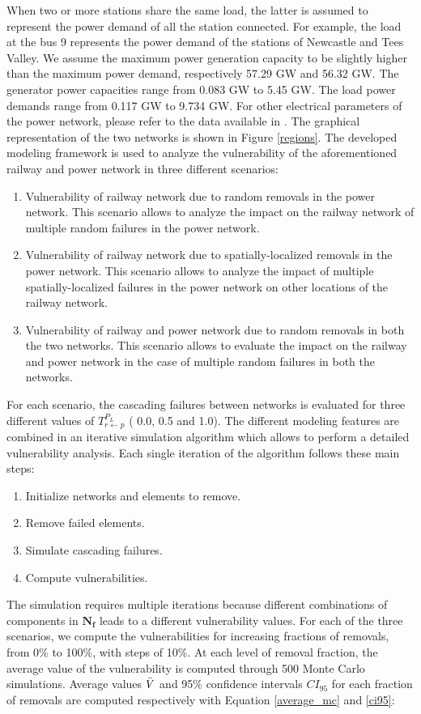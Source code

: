 \documentclass[review]{elsarticle}
\begin{document}
	When two or more stations share the same load, the latter is assumed to represent the power demand of all the station connected. For example, the load at the bus 9 represents the power demand of the stations of Newcastle and Tees Valley. We assume the maximum power generation capacity to be slightly higher than the maximum power demand, respectively 57.29 GW and 56.32 GW. The generator power capacities range from 0.083 GW to 5.45 GW. The load power demands range from 0.117 GW to 9.734 GW. For other electrical parameters of the power network, please refer to the data available in \cite{bukhsh2013network}. The graphical representation of the two networks is shown in Figure \ref{regions}.
The developed modeling framework is used to analyze the vulnerability of the aforementioned railway and power network in three different scenarios:
\begin{enumerate}
\item Vulnerability of railway network due to random removals in the power network. This scenario allows to analyze the impact on the railway network of multiple random failures in the power network.
\item Vulnerability of railway network due to spatially-localized removals in the power network. This scenario allows to analyze the impact of multiple spatially-localized failures in the power network on other locations of the railway network.
\item Vulnerability of railway and power network due to random removals in both the two networks. This scenario allows to evaluate the impact on the railway and power network in the case of multiple random failures in both the networks.
\end{enumerate}
For each scenario, the cascading failures between networks is evaluated for three different values of $T_{r \leftarrow p}^{P_L}$ ( 0.0, 0.5 and 1.0). The different modeling features are combined in an iterative simulation algorithm which allows to perform a detailed vulnerability analysis. Each single iteration of the algorithm follows these main steps:
\begin{enumerate}
    \item Initialize networks and elements to remove.
    \item Remove failed elements.
    \item Simulate cascading failures.
    \item Compute vulnerabilities.
\end{enumerate}
	The simulation requires multiple iterations because different combinations of components in $\mathbf{N_f}$ leads to a different vulnerability values. For each of the three scenarios, we compute the vulnerabilities for increasing fractions of removals, from 0\% to 100\%, with steps of 10\%. At each level of removal fraction, the average value of the vulnerability is computed through 500 Monte Carlo simulations. Average values $\Bar{V}$ and 95\% confidence intervals $CI_{95}$ for each fraction of removals are computed respectively with Equation \eqref{average_mc} and \eqref{ci95}:
\end{document}
